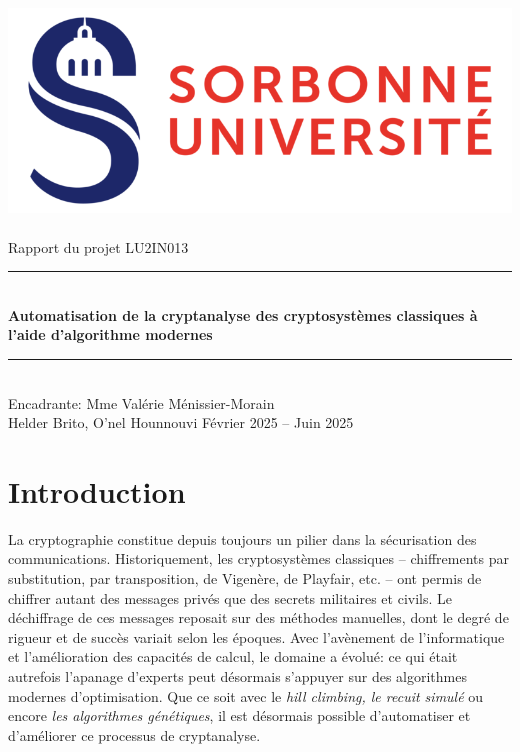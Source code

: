 \documentclass[a4paper]{article}
\begin{document}
\thispagestyle{plain} 
\begin{titlepage} 
    \begin{center} 
        \bigskip 
        \includegraphics[scale=0.5]{logo_su.jpg}~\\[4cm] 
        {\LARGE Rapport du projet LU2IN013}\\[0.3cm] 
        \rule{\linewidth}{0.5mm} \\[0.6cm] 
        {\huge \textbf{Automatisation de la cryptanalyse des cryptosystèmes classiques à l'aide d'algorithme modernes}}\\[0.4cm] 
        \rule{\linewidth}{0.5mm} \\[1cm] {\large Encadrante: Mme Valérie Ménissier-Morain}\\[5cm] 
        {\Large Helder Brito, O'nel Hounnouvi}
        \vfill Février 2025 -- Juin 2025
    \end{center} 
\end{titlepage}

\newpage

\tableofcontents

\newpage

\section{Introduction}
La cryptographie constitue depuis toujours un pilier dans la sécurisation des communications. 
Historiquement, les cryptosystèmes classiques – chiffrements par substitution, par transposition, de Vigenère, de Playfair, etc. – ont permis de chiffrer autant des messages privés que des secrets militaires et civils. 
Le déchiffrage de ces messages reposait sur des méthodes manuelles, dont le degré de rigueur et de succès variait selon les époques. Avec l'avènement de l'informatique et l'amélioration des capacités de calcul, 
le domaine a évolué: ce qui était autrefois l'apanage d'experts peut désormais s'appuyer sur des algorithmes modernes d'optimisation. Que ce soit avec le \textit{hill climbing, le recuit simulé} ou encore \textit{les algorithmes génétiques}, 
il est désormais possible d’automatiser et d’améliorer ce processus de cryptanalyse. 
\end{document}

